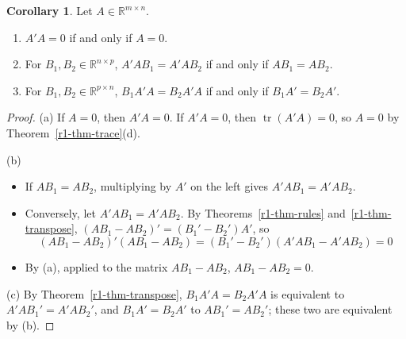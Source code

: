 \documentclass[12pt]{article}
\newcommand{\R}{\mathbb R}
\DeclareMathOperator{\tr}{tr}
\theoremstyle{definition}
\newtheorem{corollary}[theorem]{Corollary}
\begin{document}
\begin{corollary}\label{r1-cor-cancel}
Let \(A\in\R^{m\times n}\).
\begin{enumerate}
\item \(A'A=0\) if and only if \(A=0\).
\item For \(B_1,B_2\in\R^{n\times p}\), \(A'AB_1=A'AB_2\) if and only if \(AB_1=AB_2\).
\item For \(B_1,B_2\in\R^{p\times n}\), \(B_1A'A=B_2A'A\) if and only if \(B_1A'=B_2A'\).
\end{enumerate}
\end{corollary}
\begin{proof}
(a) If \(A=0\), then \(A'A=0\). If \(A'A=0\), then \(\tr(A'A)=0\), so \(A=0\) by Theorem~\ref{r1-thm-trace}(d).

(b)
\begin{itemize}
\item If \(AB_1=AB_2\), multiplying by \(A'\) on the left gives \(A'AB_1=A'AB_2\).
\item Conversely, let \(A'AB_1=A'AB_2\). By Theorems~\ref{r1-thm-rules} and~\ref{r1-thm-transpose},
\((AB_1-AB_2)'=(B_1'-B_2')A'\), so
\[
(AB_1-AB_2)'(AB_1-AB_2)=(B_1'-B_2')(A'AB_1-A'AB_2)=0
\]
\item By (a), applied to the matrix \(AB_1-AB_2\), \(AB_1-AB_2=0\).
\end{itemize}
(c) By Theorem~\ref{r1-thm-transpose}, \(B_1A'A=B_2A'A\) is equivalent to \(A'AB_1'=A'AB_2'\), and \(B_1A'=B_2A'\)
to \(AB_1'=AB_2'\); these two are equivalent by (b).
\end{proof}
\end{document}
